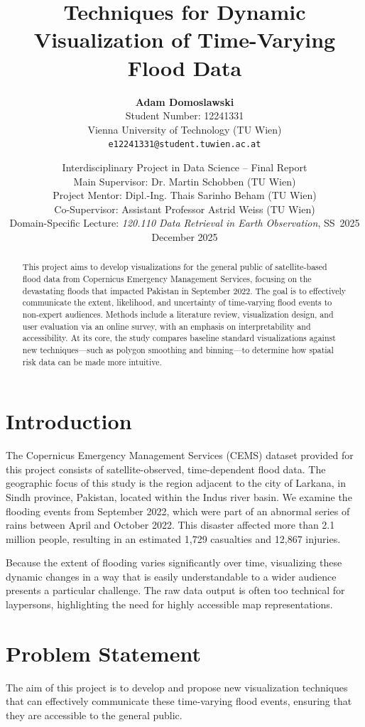 \documentclass[11pt, a4paper]{article}
\title{Techniques for Dynamic Visualization of Time-Varying Flood Data}
\author{
    \textbf{Adam Domoslawski} \\
    Student Number: 12241331 \\
    Vienna University of Technology (TU Wien) \\
    \texttt{e12241331@student.tuwien.ac.at}
}
\date{
    \vspace{1em}
    Interdisciplinary Project in Data Science -- Final Report \\
    Main Supervisor: Dr. Martin Schobben (TU Wien) \\
    Project Mentor: Dipl.-Ing. Thais Sarinho Beham (TU Wien) \\
    Co-Supervisor: Assistant Professor Astrid Weiss (TU Wien) \\
    Domain-Specific Lecture: \textit{120.110 Data Retrieval in Earth Observation}, SS~2025 \\
    \vspace{1em}
    December 2025
}
\begin{document}
\maketitle

\begin{abstract}
This project aims to develop visualizations for the general public of satellite-based flood data from Copernicus Emergency Management Services, focusing on the devastating floods that impacted Pakistan in September 2022. The goal is to effectively communicate the extent, likelihood, and uncertainty of time-varying flood events to non-expert audiences. Methods include a literature review, visualization design, and user evaluation via an online survey, with an emphasis on interpretability and accessibility. At its core, the study compares baseline standard visualizations against new techniques—such as polygon smoothing and binning—to determine how spatial risk data can be made more intuitive.
\end{abstract}

\section{Introduction}
\label{sec:intro}
The Copernicus Emergency Management Services (CEMS) dataset provided for this project consists of satellite-observed, time-dependent flood data. The geographic focus of this study is the region adjacent to the city of Larkana, in Sindh province, Pakistan, located within the Indus river basin. We examine the flooding events from September 2022, which were part of an abnormal series of rains between April and October 2022. This disaster affected more than 2.1 million people, resulting in an estimated 1,729 casualties and 12,867 injuries. 

Because the extent of flooding varies significantly over time, visualizing these dynamic changes in a way that is easily understandable to a wider audience presents a particular challenge. The raw data output is often too technical for laypersons, highlighting the need for highly accessible map representations.

\section{Problem Statement}
\label{sec:problem}
The aim of this project is to develop and propose new visualization techniques that can effectively communicate these time-varying flood events, ensuring that they are accessible to the general public. 
\end{document}
